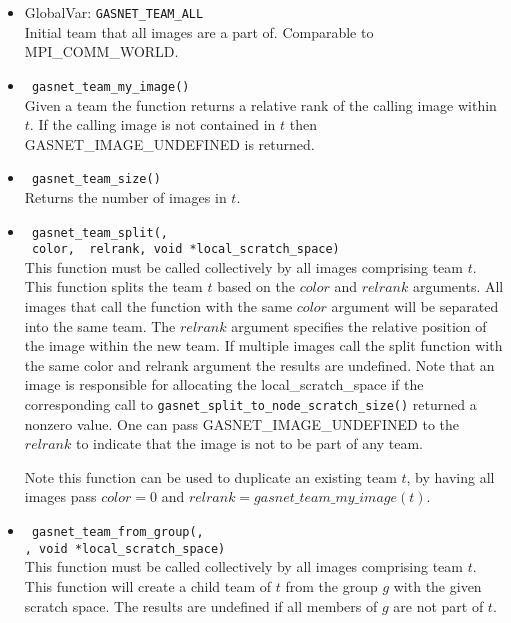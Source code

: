 \documentclass[times,10pt]{article}
\begin{document}
\begin{itemize}

\item GlobalVar: \texttt{GASNET\_TEAM\_ALL}  \\ 
Initial team that all images are a part of. Comparable to MPI\_COMM\_WORLD. 

\item \texttt{\image\ gasnet\_team\_my\_image(\teamarg)} \\ 
Given a team the function returns a relative rank of the calling image within
$t$. If the calling image is not contained in $t$ then
GASNET\_IMAGE\_UNDEFINED is returned. 

\item \texttt{\image\ gasnet\_team\_size(\teamarg)} \\ 
Returns the number of images in $t$.

\item \texttt{\team\ gasnet\_team\_split(\teamarg, \\ 
              \image\ color, \image\ relrank, void *local\_scratch\_space)} \\ 
This function must be called collectively by all images comprising team $t$.
This function splits the team $t$ based on the $color$ and $relrank$ arguments.
All images that call the function with the same $color$ argument will be
separated into the same team. The $relrank$ argument specifies the relative
position of the image within the new team. If multiple images call the split
function with the same color and relrank argument the results are undefined.
Note that an image is responsible for allocating the local\_scratch\_space if the
corresponding call to \texttt{gasnet\_split\_to\_node\_scratch\_size()} returned a
nonzero value. One can pass GASNET\_IMAGE\_UNDEFINED to the $relrank$ to
indicate that the image is not to be part of any team. 

Note this function can be used to duplicate an existing team $t$, by having all
images pass $color = 0$ and $relrank = gasnet\_team\_my\_image(t)$.

\item \texttt{\team\ gasnet\_team\_from\_group(\teamarg, \\\grouparg, void\ *local\_scratch\_space)} \\ 
This function must be called collectively by all images comprising team $t$.
This function will create a child team of $t$ from the group $g$ with the given
scratch space.  The results are undefined if all members of $g$ are not part of
$t$. 


\end{itemize}
\end{document}
